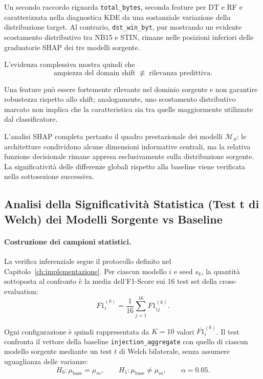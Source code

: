 Un secondo raccordo riguarda \texttt{total\_bytes}, seconda feature per DT e RF e caratterizzata nella diagnostica KDE da una sostanziale variazione della distribuzione target. 
Al contrario, \texttt{dst\_win\_byt}, pur mostrando un evidente scostamento distributivo tra NB15 e STIN, rimane nelle posizioni inferiori delle graduatorie SHAP dei tre modelli sorgente.

L'evidenza complessiva mostra quindi che
\[
    \text{ampiezza del domain shift}
    \;\not\equiv\;
    \text{rilevanza predittiva}.
\]

Una feature può essere fortemente rilevante nel dominio sorgente e non garantire robustezza rispetto allo shift; analogamente, uno scostamento distributivo marcato non implica che la caratteristica sia tra quelle maggiormente utilizzate dal classificatore.

L'analisi SHAP completa pertanto il quadro prestazionale dei modelli $\mathcal{M}_{S}$: le architetture condividono alcune dimensioni informative centrali, ma la relativa funzione decisionale rimane appresa esclusivamente sulla distribuzione sorgente. 
La significatività delle differenze globali rispetto alla baseline viene verificata nella sottosezione successiva.



\subsection{Analisi della Significatività Statistica (Test t di Welch) dei Modelli Sorgente vs Baseline}
\label{subsec:sorgente_welch_ttest}

\paragraph{Costruzione dei campioni statistici.}
La verifica inferenziale segue il protocollo definito nel Capitolo~\ref{ch:implementazione}. 
Per ciascun modello $i$ e seed $s_k$, la quantità sottoposta al confronto è la media dell'F1-Score sui $16$ test set della cross-evaluation:
\begin{equation}
    \overline{F1}_{i}^{(k)}
    =
    \frac{1}{16}
    \sum_{j=1}^{16}
    F1_{ij}^{(k)}.
    \label{eq:cap5_f1_seed_mean_source}
\end{equation}

Ogni configurazione è quindi rappresentata da $K=10$ valori $\overline{F1}_{i}^{(k)}$. 
Il test confronta il vettore della baseline \texttt{injection\_aggregate} con quello di ciascun modello sorgente mediante un test $t$ di Welch bilaterale, senza assumere uguaglianza delle varianze:
\[
    H_0:\mu_{\mathrm{base}}=\mu_m,
    \qquad
    H_1:\mu_{\mathrm{base}}\neq\mu_m,
    \qquad
    \alpha=0.05.
\]

